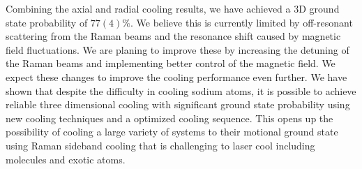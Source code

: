 \documentclass[aps,prl,twocolumn,groupedaddress]{revtex4-1}
\begin{document}
Combining the axial and radial cooling results,
we have achieved a 3D ground state probability of $77(4)\%$.
We believe this is currently limited by off-resonant scattering from the Raman beams
and the resonance shift caused by magnetic field fluctuations.
We are planing to improve these by increasing the detuning of the Raman beams
and implementing better control of the magnetic field.
We expect these changes to improve the cooling performance even further.
We have shown that despite the difficulty in cooling sodium atoms,
it is possible to achieve reliable three dimensional cooling with significant ground state
probability using new cooling techniques and a optimized cooling sequence.
This opens up the possibility of cooling a large variety of systems to their motional ground
state using Raman sideband cooling that is challenging to laser cool
including molecules and exotic atoms.



\end{document}
